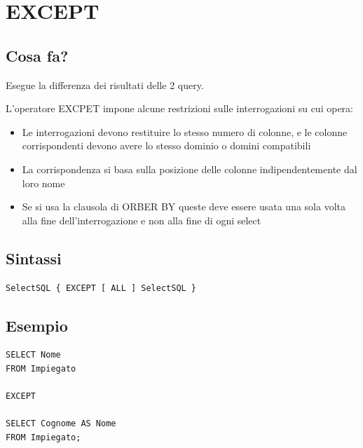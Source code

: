 \section{EXCEPT}
\subsection{Cosa fa?}
Esegue la differenza dei risultati delle 2 query.

L'operatore EXCPET impone alcune restrizioni sulle interrogazioni su cui opera:
\begin{itemize}
    \item Le interrogazioni devono restituire lo stesso numero di colonne, e le colonne corrispondenti devono avere lo stesso dominio o domini compatibili
    \item La corrispondenza si basa sulla posizione delle colonne indipendentemente dal loro nome
    \item Se si usa la clausola di ORBER BY queste deve essere usata una sola volta alla fine dell'interrogazione e non alla fine di ogni select
\end{itemize}

\subsection{Sintassi}
\begin{lstlisting}[language=sql_generic]
SelectSQL { EXCEPT [ ALL ] SelectSQL }
\end{lstlisting}

\subsection{Esempio}
\begin{lstlisting}[language=sql_generic]
SELECT Nome 
FROM Impiegato

EXCEPT 

SELECT Cognome AS Nome 
FROM Impiegato;
\end{lstlisting}